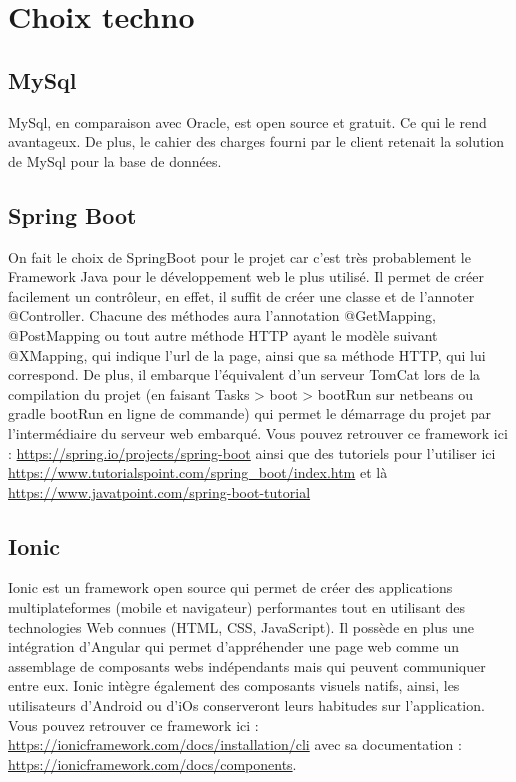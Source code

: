 	\section{Choix techno}


		\subsection{MySql}
			MySql, en comparaison avec Oracle, est open source et gratuit. Ce qui le rend avantageux. \newline
			De plus, le cahier des charges fourni par le client retenait la solution de MySql pour la base de données.

		\subsection{Spring Boot}
			On fait le choix de SpringBoot pour le projet car c'est très probablement le Framework Java pour le développement web le plus utilisé. Il permet de créer facilement un contrôleur, en effet, il suffit de créer une classe et de l’annoter @Controller. Chacune des méthodes aura l’annotation @GetMapping, @PostMapping ou tout autre méthode HTTP ayant le modèle suivant @XMapping, qui indique l'url de la page, ainsi que sa méthode HTTP, qui lui correspond.\newline
			De plus, il embarque l'équivalent d'un serveur TomCat lors de la compilation du projet (en faisant Tasks > boot > bootRun sur netbeans ou gradle bootRun en ligne de commande) qui permet le démarrage du projet par l'intermédiaire du serveur web embarqué. \newline
			Vous pouvez retrouver ce framework ici : \url{https://spring.io/projects/spring-boot} ainsi que des tutoriels pour l'utiliser ici \url{https://www.tutorialspoint.com/spring_boot/index.htm} et là \url{https://www.javatpoint.com/spring-boot-tutorial}

		\subsection{Ionic}
			Ionic est un framework open source qui permet de créer des applications multiplateformes (mobile et navigateur) performantes tout en utilisant des technologies Web connues (HTML, CSS, JavaScript). Il possède en plus une intégration d'Angular qui permet d'appréhender une page web comme un assemblage de composants webs indépendants mais qui peuvent communiquer entre eux. \newline
			Ionic intègre également des composants visuels natifs, ainsi, les utilisateurs d'Android ou d'iOs conserveront leurs habitudes sur l'application. \newline
			Vous pouvez retrouver ce framework ici : \url{https://ionicframework.com/docs/installation/cli} avec sa documentation : \url{https://ionicframework.com/docs/components}.

